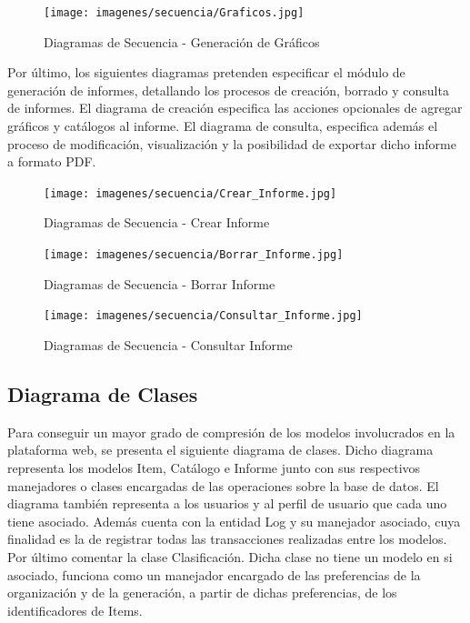 \documentclass[a4paper,11pt]{book}
\begin{document}
\begin{figure}[H] 
\centering 
\texttt{[image: imagenes/secuencia/Graficos.jpg]}
\caption{ Diagramas de Secuencia - Generación de Gráficos\cite{diagrama}  }  
\end{figure}

Por último, los siguientes diagramas pretenden especificar el módulo de generación de informes, detallando los procesos de creación, borrado y consulta de informes. El diagrama de creación especifica las acciones opcionales de agregar gráficos y catálogos al informe. El diagrama de consulta, especifica además el proceso de modificación, visualización y la posibilidad de exportar dicho informe a formato PDF. 

\begin{figure}[H] 
\centering 
\texttt{[image: imagenes/secuencia/Crear\_Informe.jpg]}
\caption{ Diagramas de Secuencia - Crear Informe\cite{diagrama}  }  
\end{figure}

\begin{figure}[H] 
\centering 
\texttt{[image: imagenes/secuencia/Borrar\_Informe.jpg]}
\caption{ Diagramas de Secuencia - Borrar Informe\cite{diagrama}  }  
\end{figure}

\begin{figure}[H] 
\centering 
\texttt{[image: imagenes/secuencia/Consultar\_Informe.jpg]}
\caption{ Diagramas de Secuencia - Consultar Informe\cite{diagrama}  }  
\end{figure}

\subsection{Diagrama de Clases}

Para conseguir un mayor grado de compresión de los modelos involucrados en la plataforma web, se presenta el siguiente diagrama de clases. Dicho diagrama representa los modelos Item, Catálogo e Informe junto con sus respectivos manejadores o clases encargadas de las operaciones sobre la base de datos. El diagrama también representa a los usuarios y al perfil de usuario que cada uno tiene asociado.  Además cuenta con la entidad Log y su manejador asociado, cuya finalidad es la de registrar todas las transacciones realizadas entre los modelos. Por último comentar la clase Clasificación. Dicha clase no tiene un modelo en si asociado, funciona como un manejador encargado de las preferencias de la organización y de la generación, a partir de dichas preferencias, de los identificadores de Items. 
\end{document}

